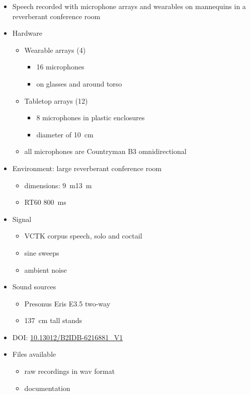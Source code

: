 \documentclass[14pt, legalpaper]{extarticle}
\begin{document}
\begin{itemize}

\item Speech recorded with microphone arrays and wearables on mannequins in a reverberant conference room \cite{corey2019massive}

\item Hardware
	\begin{itemize}
	\item Wearable arrays (4)
		\begin{itemize}
		\item 16 microphones
		\item on glasses and around torso 
		\end{itemize}
	\item Tabletop arrays (12)
		\begin{itemize}
		\item 8 microphones in plastic enclosures
		\item diameter of \SI{10}{\centi\metre}
		\end{itemize}
	\item all microphones are Countryman B3 omnidirectional
	\end{itemize}

\item Environment: large reverberant conference room
	\begin{itemize}
	\item dimensions: \SI{9}{\metre}\texttimes\SI{13}{\metre}
	\item RT60 \SI{800}{\milli\second} 
	\end{itemize}

\item Signal
	\begin{itemize}
	\item VCTK corpus speech, solo and coctail
	\item sine sweeps
	\item ambient noise
	\end{itemize}

\item Sound sources
	\begin{itemize}
	\item Presonus Eris E3.5 two-way 
	\item \SI{137}{\centi\metre} tall stands
	\end{itemize}

\item DOI: \href{https://databank.illinois.edu/datasets/IDB-6216881}{10.13012/B2IDB-6216881\_V1}

\item Files available
	\begin{itemize}
	\item raw recordings in wav format
	\item documentation
	\end{itemize}

\end{itemize}
\end{document}

